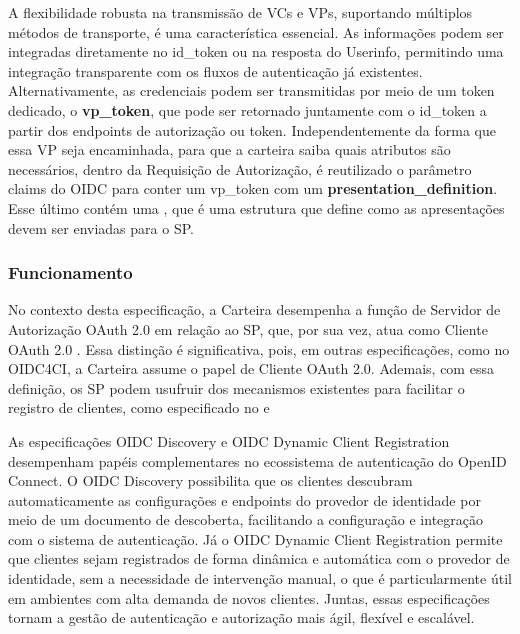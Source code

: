 A flexibilidade robusta na transmissão de \acs{VC}s e \acs{VP}s, suportando múltiplos métodos de transporte, é uma característica essencial. As informações podem ser integradas diretamente no id\_token ou na resposta do Userinfo, permitindo uma integração transparente com os fluxos de autenticação já existentes. Alternativamente, as credenciais podem ser transmitidas por meio de um token dedicado, o \textbf{vp\_token}, que pode ser retornado juntamente com o id\_token a partir dos endpoints de autorização ou token. Independentemente da forma que essa \acs{VP} seja encaminhada, para que a carteira saiba quais atributos são necessários, dentro da Requisição de Autorização, é reutilizado o parâmetro claims do \acs{OIDC} para conter um vp\_token com um \textbf{presentation\_definition}. Esse último contém uma  \cite{presentation-exchange}, que é uma estrutura que define como as apresentações devem ser enviadas para o \acs{SP}.


\subsubsection{Funcionamento}{\label{subsubsection:oidc4vc}}

No contexto desta especificação, a Carteira desempenha a função de Servidor de Autorização OAuth 2.0 em relação ao \acs{SP}, que, por sua vez, atua como Cliente OAuth 2.0 \cite{OIDC4VP2023}. Essa distinção é significativa, pois, em outras especificações, como no \acs{OIDC4CI}, a Carteira assume o papel de Cliente OAuth 2.0. Ademais, com essa definição, os \acs{SP} podem usufruir dos mecanismos existentes para facilitar o registro de clientes, como especificado no  \cite{sakimura2023openidDiscovery} e  \cite{sakimura2023openid-dcr}


As especificações \acs{OIDC Discovery} e \acs{OIDC Dynamic Client Registration} desempenham papéis complementares no ecossistema de autenticação do OpenID Connect. O OIDC Discovery possibilita que os clientes descubram automaticamente as configurações e endpoints do provedor de identidade por meio de um documento de descoberta, facilitando a configuração e integração com o sistema de autenticação. Já o OIDC Dynamic Client Registration permite que clientes sejam registrados de forma dinâmica e automática com o provedor de identidade, sem a necessidade de intervenção manual, o que é particularmente útil em ambientes com alta demanda de novos clientes. Juntas, essas especificações tornam a gestão de autenticação e autorização mais ágil, flexível e escalável.

